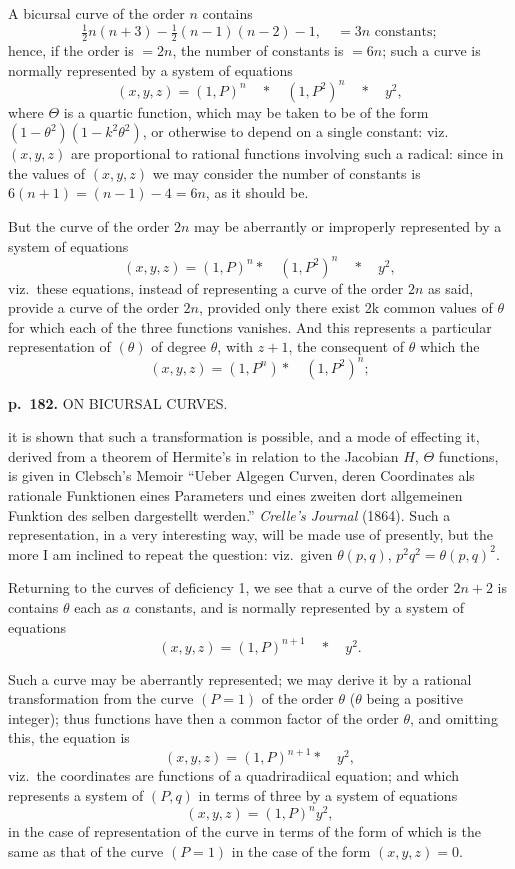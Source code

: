 \documentclass[11pt,a4paper]{book}
\begin{document}
A bicursal curve of the order $n$ contains
\[
\tfrac{1}{2}n(n+3) - \tfrac{1}{2}(n - 1)(n - 2) - 1, \quad = 3n \text{ constants};
\]
hence, if the order is $= 2n$, the number of constants is $= 6n$; such a curve is normally represented by a system of equations
\[
(x, y, z) = (1, P)^n \quad \ast \quad (1, P^2)^n \quad \ast \quad y^2,
\]
where $\Theta$ is a quartic function, which may be taken to be of the form $(1 - \theta^2)(1 - k^2 \theta^2)$, or otherwise to depend on a single constant: viz.\ $(x, y, z)$ are proportional to rational functions involving such a radical: since in the values of $(x, y, z)$ we may consider the number of constants is $6(n + 1) = (n - 1) - 4 = 6n$, as it should be.

But the curve of the order $2n$ may be aberrantly or improperly represented by a system of equations
\[
(x, y, z) = (1, P)^n \ast \quad (1, P^2)^n \quad \ast \quad y^2,
\]
viz.\ these equations, instead of representing a curve of the order $2n$ as said, provide a curve of the order $2n$, provided only there exist 2k common values of $\theta$ for which each of the three functions vanishes.  And this represents a particular representation of $(\theta)$ of degree $\theta$, with $z + 1$, the consequent of $\theta$ which the
\[
(x, y, z) = (1, P^n) \ast \quad (1, P^2)^n;
\]

\clearpage

\noindent
\textbf{p.~182.}  ON BICURSAL CURVES.

it is shown that such a transformation is possible, and a mode of effecting it, derived from a theorem of Hermite's in relation to the Jacobian $H$, $\Theta$ functions, is given in Clebsch's Memoir ``Ueber Algegen Curven, deren Coordinates als rationale Funktionen eines Parameters und eines zweiten dort allgemeinen Funktion des selben dargestellt werden.'' \textit{Crelle's Journal} (1864).  Such a representation, in a very interesting way, will be made use of presently, but the more I am inclined to repeat the question: viz.\ given $\theta(p, q)$, $p^2 q^2 = \theta(p, q)^2$.

Returning to the curves of deficiency 1, we see that a curve of the order $2n + 2$ is contains $\theta$ each as $a$ constants, and is normally represented by a system of equations
\[
(x, y, z) = (1, P)^{n+1} \quad \ast \quad y^2.
\]

Such a curve may be aberrantly represented; we may derive it by a rational transformation from the curve $(P = 1)$ of the order $\theta$ ($\theta$ being a positive integer); thus functions have then a common factor of the order $\theta$, and omitting this, the equation is
\[
(x, y, z) = (1, P)^{n+1} \ast \quad y^2,
\]
viz.\ the coordinates are functions of a quadriradiical equation; and which represents a system of $(P, q)$ in terms of three by a system of equations
\[
(x, y, z) = (1, P)^{n} y^2,
\]
in the case of representation of the curve in terms of the form of which is the same as that of the curve $(P = 1)$ in the case of the form $(x, y, z) = 0$.
\end{document}
